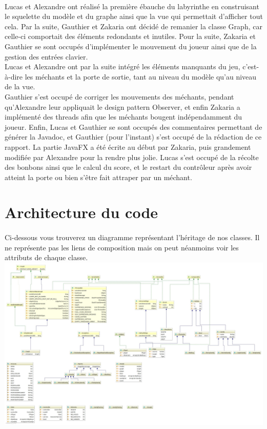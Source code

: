 \documentclass{article}
\begin{document}
  \paragraph{}
  Lucas et Alexandre ont réalisé la première ébauche du labyrinthe en
  construisant le squelette du modèle et du graphe ainsi que la vue qui
  permettait d'afficher tout cela. Par la suite, Gauthier et Zakaria ont décidé
  de remanier la classe Graph, car celle-ci comportait des éléments redondants
  et inutiles. Pour la suite, Zakaria et Gauthier se sont occupés d'implémenter
  le mouvement du joueur ainsi que de la gestion des entrées clavier.\\
  Lucas et Alexandre ont par la suite intégré les éléments manquants du jeu,
  c'est-à-dire les méchants et la porte de sortie, tant au niveau du
  modèle qu'au niveau de la vue.\\
  Gauthier s'est occupé de corriger les mouvements des méchants, pendant
  qu'Alexandre leur appliquait le design pattern Observer, et enfin Zakaria a
  implémenté des threads afin que les méchants bougent indépendamment du joueur.
  Enfin, Lucas et Gauthier se sont occupés des commentaires permettant de
  générer la Javadoc, et Gauthier (pour l'instant) s'est occupé de la rédaction
  de ce rapport. La partie JavaFX a été écrite au début par Zakaria, puis grandement
  modifiée par Alexandre pour la rendre plus jolie. Lucas s'est occupé de la récolte des
  bonbons ainsi que le calcul du score, et le restart du contrôleur après avoir atteint
  la porte ou bien s'être fait attraper par un méchant.

  \section{Architecture du code}
  \paragraph{}
  Ci-dessous vous trouverez un diagramme représentant l'héritage de nos classes.
  Il ne représente pas les liens de composition mais on peut néanmoins voir les
  attributs de chaque classe.\\

  \includegraphics[width=17cm]{Controller2.jpg}
\end{document}
